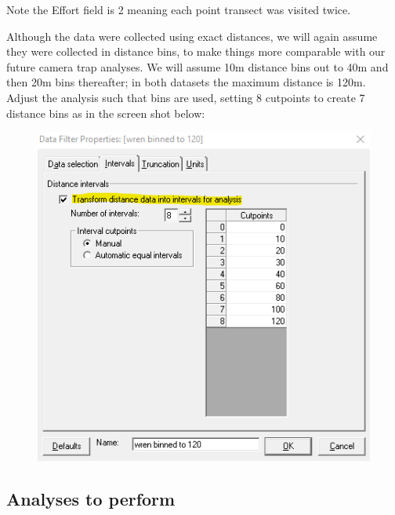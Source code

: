 \documentclass[a4paper, 10pt]{article}
\begin{document}
Note the Effort field is 2 meaning each point transect was visited twice.

Although the data were collected using exact distances, we will again assume they were collected in distance bins, to make things more comparable with our future camera trap analyses. We will assume 10m distance bins out to 40m and then 20m bins thereafter; in both datasets the maximum distance is 120m. Adjust the analysis such that bins are used, setting 8 cutpoints to create 7 distance bins as in the screen shot below:

\begin{figure}
\centering
\includegraphics[scale=0.5]{DistWingrabs/transform-to-bins.png}
\end{figure}

\subsection{Analyses to perform}
\end{document}

